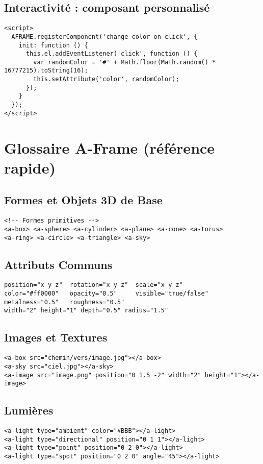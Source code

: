 \documentclass[12pt]{article}
\begin{document}
\subsection{Interactivité : composant personnalisé}
\begin{verbatim}
<script>
  AFRAME.registerComponent('change-color-on-click', {
    init: function () {
      this.el.addEventListener('click', function () {
        var randomColor = '#' + Math.floor(Math.random() * 16777215).toString(16);
        this.setAttribute('color', randomColor);
      });
    }
  });
</script>
\end{verbatim}

\section{Glossaire A-Frame (référence rapide)}
\subsection{Formes et Objets 3D de Base}
\begin{verbatim}
<!-- Formes primitives -->
<a-box> <a-sphere> <a-cylinder> <a-plane> <a-cone> <a-torus>
<a-ring> <a-circle> <a-triangle> <a-sky>
\end{verbatim}

\subsection{Attributs Communs}
\begin{verbatim}
position="x y z"  rotation="x y z"  scale="x y z"
color="#ff0000"   opacity="0.5"     visible="true/false"
metalness="0.5"   roughness="0.5"
width="2" height="1" depth="0.5" radius="1.5"
\end{verbatim}

\subsection{Images et Textures}
\begin{verbatim}
<a-box src="chemin/vers/image.jpg"></a-box>
<a-sky src="ciel.jpg"></a-sky>
<a-image src="image.png" position="0 1.5 -2" width="2" height="1"></a-image>
\end{verbatim}

\subsection{Lumières}
\begin{verbatim}
<a-light type="ambient" color="#BBB"></a-light>
<a-light type="directional" position="0 1 1"></a-light>
<a-light type="point" position="0 2 0"></a-light>
<a-light type="spot" position="0 2 0" angle="45"></a-light>
\end{verbatim}
\end{document}
